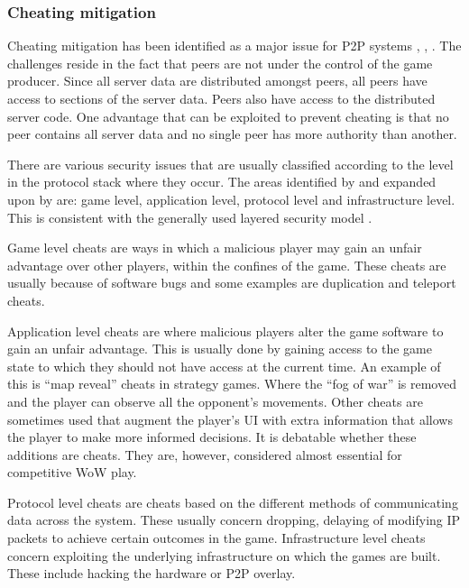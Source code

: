 \subsubsection{Cheating mitigation}
\label{key_challenges_cheating}

Cheating mitigation has been identified as a major issue for P2P systems \cite{knutsson_p2p_first}, \cite{challenges_p2p_gaming},
\cite{cheat_proof_event_ordering}. The challenges reside in the fact that peers are not under the control of the game producer. Since all server data
are distributed amongst peers, all peers have access to sections of the server data. Peers also have access to the distributed server code. One
advantage that can be exploited to prevent cheating is that no peer contains all server data and no single peer has more authority than another.

There are various security issues that are usually classified according to the level in the protocol stack where they occur. The areas identified by
\cite{cheat_proof_event_ordering} and expanded upon by \cite{cheating_taxonomy} are: game level, application level, protocol level and infrastructure level. This is consistent with the generally used layered security model \cite{distributed_systems_security}.

Game level cheats are ways in which a malicious player may gain an unfair advantage over other players, within the confines of the game. These cheats are usually because of software bugs and some examples are duplication and teleport cheats.

Application level cheats are where malicious players alter the game software to gain an unfair advantage. This is usually done by gaining access to
the game state to which they should not have access at the current time. An example of this is ``map reveal'' cheats in strategy games. Where the
``fog of war'' is removed and the player can observe all the opponent's movements. Other cheats are sometimes used that augment the player's UI with extra information that allows the player to make more informed decisions. It is debatable whether these additions are cheats. They are, however, considered almost essential for competitive WoW play.

Protocol level cheats are cheats based on the different methods of communicating data across the system. These usually concern dropping, delaying of modifying IP packets to achieve certain outcomes in the game. Infrastructure level cheats concern exploiting the underlying infrastructure on which the games are built. These include hacking the hardware or P2P overlay.

